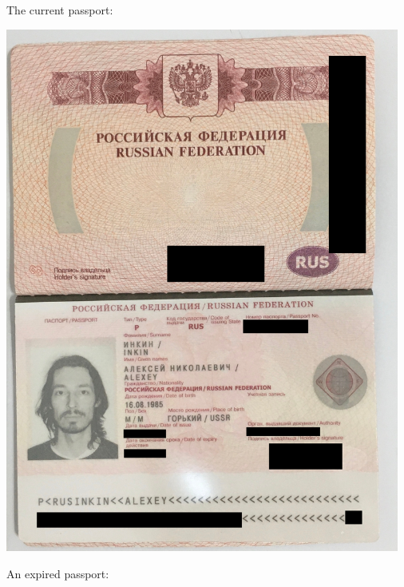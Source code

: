 \label{Passport}

The current passport:

\includegraphics[width=35em]{passport-2022_public}
\pagebreak

An expired passport:

